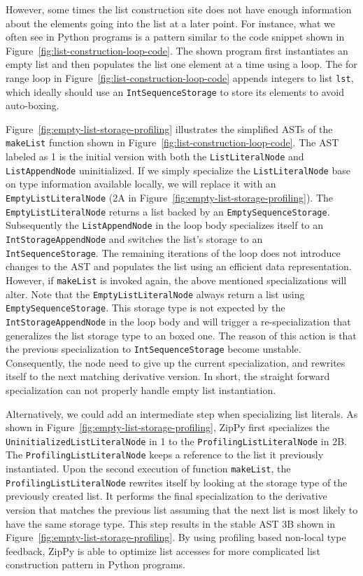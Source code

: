 However, some times the list construction site does not have enough information about the elements going into the list at a later point.
For instance, what we often see in Python programs is a pattern similar to the code snippet shown in Figure~\ref{fig:list-construction-loop-code}.
The shown program first instantiates an empty list and then populates the list one element at a time using a loop.
The for range loop in Figure~\ref{fig:list-construction-loop-code} appends integers to list \texttt{lst},
which ideally should use an \texttt{IntSequenceStorage} to store its elements to avoid auto-boxing.

Figure~\ref{fig:empty-list-storage-profiling} illustrates the simplified ASTs of the \texttt{makeList} function shown in Figure~\ref{fig:list-construction-loop-code}.
The AST labeled as \textsf{1} is the initial version with both the \texttt{ListLiteralNode} and \texttt{ListAppendNode} uninitialized.
If we simply specialize the \texttt{ListLiteralNode} base on type information available locally, we will replace it with an \texttt{EmptyListLiteralNode} (\textsf{2A} in Figure~\ref{fig:empty-list-storage-profiling}).
The \texttt{EmptyListLiteralNode} returns a list backed by an \texttt{EmptySequenceStorage}.
Subsequently the \texttt{ListAppendNode} in the loop body specializes itself to an \texttt{IntStorageAppendNode} and switches the list's storage to an \texttt{IntSequenceStorage}.
The remaining iterations of the loop does not introduce changes to the AST and populates the list using an efficient data representation.
However, if \texttt{makeList} is invoked again, the above mentioned specializations will alter.
Note that the \texttt{EmptyListLiteralNode} always return a list using \texttt{EmptySequenceStorage}.
This storage type is not expected by the \texttt{IntStorageAppendNode} in the loop body and will trigger a re-specialization that generalizes the list storage type to an boxed one.
The reason of this action is that the previous specialization to \texttt{IntSequenceStorage} become unstable.
Consequently, the node need to give up the current specialization, and rewrites itself to the next matching derivative version.
In short, the straight forward specialization can not properly handle empty list instantiation.

Alternatively, we could add an intermediate step when specializing list literals.
As shown in Figure~\ref{fig:empty-list-storage-profiling}, ZipPy first specializes the \texttt{UninitializedListLiteralNode} in \textsf{1} to the \texttt{Profili\-ngListLiteralNode} in \textsf{2B}.
The \texttt{ProfilingListLiteralNode} keeps a reference to the list it previously instantiated.
Upon the second execution of function \texttt{makeList}, the \texttt{ProfilingLis\-tLiteralNode} rewrites itself by looking at the storage type of the previously created list.
It performs the final specialization to the derivative version that matches the previous list assuming that the next list is most likely to have the same storage type.
This step results in the stable AST \textsf{3B} shown in Figure~\ref{fig:empty-list-storage-profiling}.
By using profiling based non-local type feedback, ZipPy is able to optimize list accesses for more complicated list construction pattern in Python programs.

